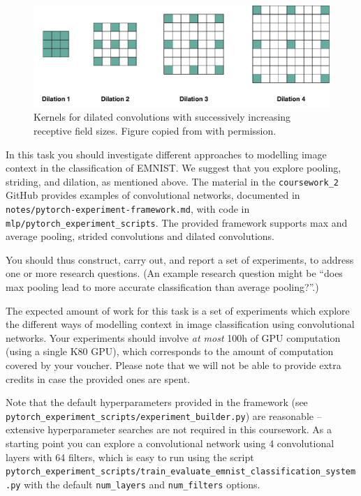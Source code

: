 \documentclass[11pt,]{article}
\begin{document}
\begin{figure}[t]
    \centering
    \includegraphics[width=\textwidth]{dilations.pdf}
    \caption{Kernels for dilated convolutions with successively increasing receptive field sizes.  Figure copied from \citet{antoniou2018dilated} with permission.}
    \label{fig:dilation}
\end{figure}

In this task you should investigate different approaches to modelling image context in the classification of EMNIST.  We suggest that you explore pooling, striding, and dilation, as mentioned above.  The material in the \texttt{coursework\_2} GitHub provides examples of convolutional networks, documented in \texttt{notes/pytorch-experiment-framework.md}, with code in \texttt{mlp/pytorch\_experiment\_scripts}.  The provided framework supports max and average pooling, strided convolutions and dilated convolutions.

You should thus construct, carry out, and report a set of experiments, to address one or more research questions. (An example research question might be ``does max pooling lead to more accurate classification than average pooling?''.)   

The expected amount of work for this task is a set of experiments which explore the different ways of modelling context in image classification using convolutional networks. Your experiments should involve \emph{at  most} 100h of GPU computation (using a single K80 GPU), which corresponds to the amount of computation covered by your voucher. Please note that we will not be able to provide extra credits in case the provided ones are spent.

Note that the default hyperparameters provided in the framework (see\\ \texttt{pytorch\_experiment\_scripts/experiment\_builder.py}) are reasonable -- extensive hyperparameter searches are  not required in this coursework.  As a starting point you can explore a convolutional network using 4 convolutional layers with 64 filters, which is easy to run using the script \texttt{pytorch\_experiment\_scripts/train\_evaluate\_emnist\_classification\_system.py} with the default \texttt{num\_layers} and \texttt{num\_filters} options.
\end{document}
